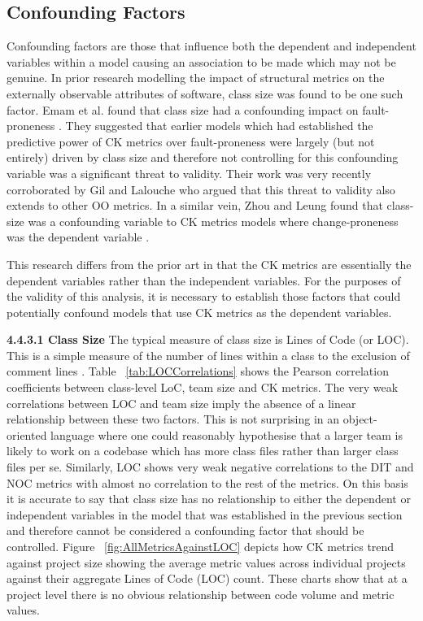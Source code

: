 \subsection{Confounding Factors}
Confounding factors are those that influence both the dependent and independent variables within a model causing an association to be made which may not be genuine. In prior research modelling the impact of structural metrics on the externally observable attributes of software, class size was found to be one such factor. Emam et al. found that class size had a confounding impact on fault-proneness \citep{el2001prediction}. They suggested that earlier models which had established the predictive power of CK metrics over fault-proneness were largely (but not entirely) driven by class size and therefore not controlling for this confounding variable was a significant threat to validity. Their work was very recently corroborated by Gil and Lalouche \citep{gil2017correlation} who argued that this threat to validity also extends to other OO metrics. In a similar vein, Zhou and Leung found that class-size was a confounding variable to CK metrics models where change-proneness was the dependent variable \citep{zhou2006empirical}.

This research differs from the prior art in that the CK metrics are essentially the dependent variables rather than the independent variables. For the purposes of the validity of this analysis, it is necessary to establish those factors that could potentially confound models that use CK metrics as the dependent variables.

\newline
\textbf{4.4.3.1 Class Size}
\newline
The typical measure of class size is  Lines of Code (or LOC). This is a simple measure of the number of lines within a class to the exclusion of comment lines \citep{nguyen2007sloc}. Table ~\ref{tab:LOCCorrelations} shows the Pearson correlation coefficients between class-level LoC, team size and CK metrics.  The very weak correlations between LOC and team size imply the absence of a linear relationship between these two factors. This is not surprising in an object-oriented language where one could reasonably hypothesise that a larger team is likely to work on a codebase which has more class files rather than larger class files per se. Similarly, LOC shows very weak negative correlations to the DIT and NOC metrics with almost no correlation to the rest of the metrics. On this basis it is accurate to say that class size has no relationship to either the dependent or independent variables in the model that was established in the previous section and therefore cannot be considered a confounding factor that should be controlled. Figure ~\ref{fig:AllMetricsAgainstLOC}  depicts how CK metrics trend against project size showing the average metric values across individual projects against their aggregate Lines of Code (LOC) count. These charts show that at a project level there is no obvious relationship between code volume and metric values.


